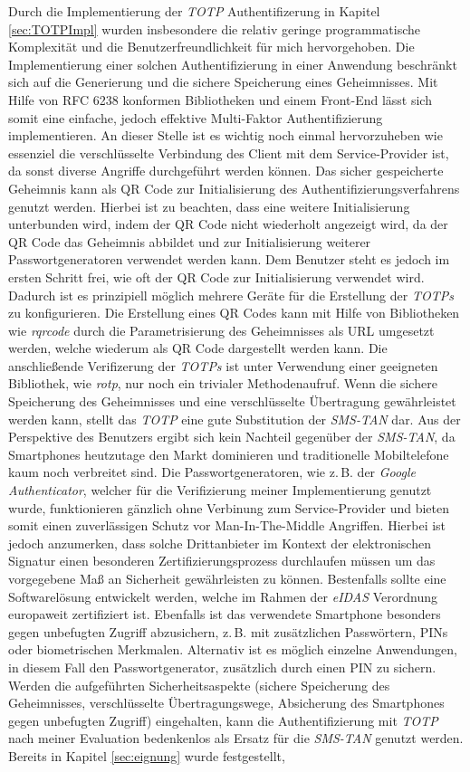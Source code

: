 \documentclass[11pt,a4paper,ngerman]{scrreprt}
\begin{document}
Durch die Implementierung der \textit{TOTP} Authentifizerung in Kapitel \ref{sec:TOTPImpl} wurden insbesondere die relativ geringe programmatische Komplexität und die Benutzerfreundlichkeit für mich hervorgehoben. Die Implementierung einer solchen Authentifizierung in einer Anwendung beschränkt sich auf die Generierung und die sichere Speicherung eines Geheimnisses. Mit Hilfe von RFC 6238 konformen Bibliotheken und einem Front-End lässt sich somit eine einfache, jedoch effektive Multi-Faktor Authentifizierung implementieren. An dieser Stelle ist es wichtig noch einmal hervorzuheben wie essenziel die verschlüsselte Verbindung des Client mit dem Service-Provider ist, da sonst diverse Angriffe durchgeführt werden können. Das sicher gespeicherte Geheimnis kann als QR Code zur Initialisierung des Authentifizierungsverfahrens genutzt werden. Hierbei ist zu beachten, dass eine weitere Initialisierung unterbunden wird, indem der QR Code nicht wiederholt angezeigt wird, da der QR Code das Geheimnis abbildet und zur Initialisierung weiterer Passwortgeneratoren verwendet werden kann. Dem Benutzer steht es jedoch im ersten Schritt frei, wie oft der QR Code zur Initialisierung verwendet wird. Dadurch ist es prinzipiell möglich mehrere Geräte für die Erstellung der \textit{TOTPs} zu konfigurieren. Die Erstellung eines QR Codes kann mit Hilfe von Bibliotheken wie \textit{rqrcode} durch die Parametrisierung des Geheimnisses als URL umgesetzt werden, welche wiederum als QR Code dargestellt werden kann. Die anschließende Verifizerung der \textit{TOTPs} ist unter Verwendung einer geeigneten Bibliothek, wie \textit{rotp}, nur noch ein trivialer Methodenaufruf. Wenn die sichere Speicherung des Geheimnisses und eine verschlüsselte Übertragung gewährleistet werden kann, stellt das \textit{TOTP} eine gute Substitution der \textit{SMS-TAN} dar. Aus der Perspektive des Benutzers ergibt sich kein Nachteil gegenüber der \textit{SMS-TAN}, da Smartphones heutzutage den Markt dominieren und traditionelle Mobiltelefone kaum noch verbreitet sind. Die Passwortgeneratoren, wie z.\,B. der \textit{Google Authenticator}, welcher für die Verifizierung meiner Implementierung genutzt wurde, funktionieren gänzlich ohne Verbinung zum Service-Provider und bieten somit einen zuverlässigen Schutz vor Man-In-The-Middle Angriffen. Hierbei ist jedoch anzumerken, dass solche Drittanbieter im Kontext der elektronischen Signatur einen besonderen Zertifizierungsprozess durchlaufen müssen um das vorgegebene Maß an Sicherheit gewährleisten zu können. Bestenfalls sollte eine Softwarelösung entwickelt werden, welche im Rahmen der \textit{eIDAS} Verordnung europaweit zertifiziert ist. Ebenfalls ist das verwendete Smartphone besonders gegen unbefugten Zugriff abzusichern, z.\,B. mit zusätzlichen Passwörtern, PINs oder biometrischen Merkmalen. Alternativ ist es möglich einzelne Anwendungen, in diesem Fall den Passwortgenerator, zusätzlich durch einen PIN zu sichern. Werden die aufgeführten Sicherheitsaspekte (sichere Speicherung des Geheimnisses, verschlüsselte Übertragungswege, Absicherung des Smartphones gegen unbefugten Zugriff) eingehalten, kann die Authentifizierung mit \textit{TOTP} nach meiner Evaluation bedenkenlos als Ersatz für die \textit{SMS-TAN} genutzt werden. Bereits in Kapitel \ref{sec:eignung} wurde festgestellt, 
\end{document}
